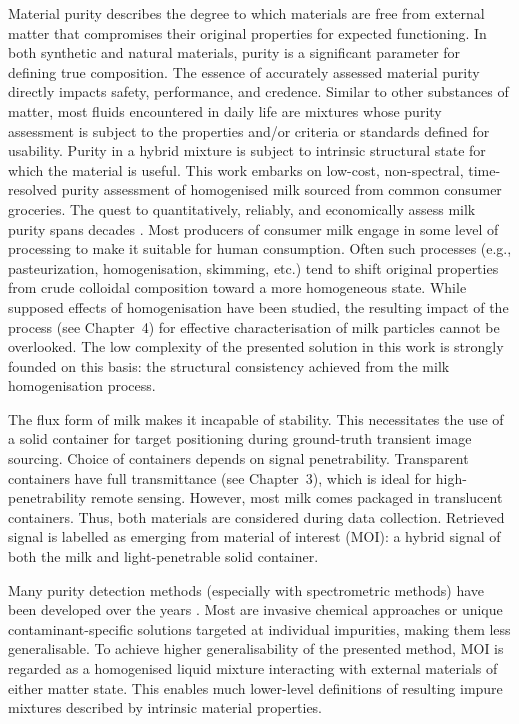 \documentclass[12pt,a4paper,oneside]{report}
\begin{document}
Material purity describes the degree to which materials are free from external matter that compromises their original properties for expected functioning. In both synthetic and natural materials, purity is a significant parameter for defining true composition. The essence of accurately assessed material purity directly impacts safety, performance, and credence. Similar to other substances of matter, most fluids encountered in daily life are mixtures whose purity assessment is subject to the properties and/or criteria or standards defined for usability. Purity in a hybrid mixture is subject to intrinsic structural state for which the material is useful. This work embarks on low-cost, non-spectral, time-resolved purity assessment of homogenised milk sourced from common consumer groceries. The quest to quantitatively, reliably, and economically assess milk purity spans decades \cite{biggs1967,barbano1989}. Most producers of consumer milk engage in some level of processing to make it suitable for human consumption. Often such processes (e.g., pasteurization, homogenisation, skimming, etc.) tend to shift original properties from crude colloidal composition toward a more homogeneous state. While supposed effects \cite{michalski2007,walstra1999} of homogenisation have been studied, the resulting impact of the process (see Chapter~4) \cite{barbano1989} for effective characterisation of milk particles \cite{aernouts2015,melfsen2012} cannot be overlooked. The low complexity of the presented solution in this work is strongly founded on this basis: the structural consistency achieved from the milk homogenisation process.

The flux form of milk makes it incapable of stability. This necessitates the use of a solid container for target positioning during ground-truth transient image sourcing. Choice of containers depends on signal penetrability. Transparent containers have full transmittance (see Chapter~3), which is ideal for high-penetrability remote sensing. However, most milk comes packaged in translucent containers. Thus, both materials are considered during data collection. Retrieved signal is labelled as emerging from material of interest (MOI): a hybrid signal of both the milk and light-penetrable solid container.

Many purity detection methods (especially with spectrometric methods) have been developed over the years \cite{joolaei2025}. Most are invasive chemical approaches or unique contaminant-specific solutions targeted at individual impurities, making them less generalisable. To achieve higher generalisability of the presented method, MOI is regarded as a homogenised liquid mixture interacting with external materials of either matter state. This enables much lower-level definitions of resulting impure mixtures described by intrinsic material properties.
\end{document}
